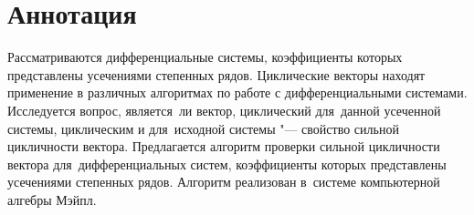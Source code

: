 \section*{Аннотация}

Рассматриваются дифференциальные системы, коэффициенты которых представлены усечениями степенных рядов.
Циклические векторы находят применение в различных алгоритмах по работе с дифференциальными системами.
Исследуется вопрос, является~ли вектор, циклический для~данной усеченной системы,
циклическим и для~исходной системы "--- свойство сильной цикличности вектора.
Предлагается алгоритм проверки сильной цикличности вектора для~дифференциальных систем,
коэффициенты которых представлены усечениями степенных рядов.
Алгоритм реализован в~системе компьютерной алгебры Мэйпл.